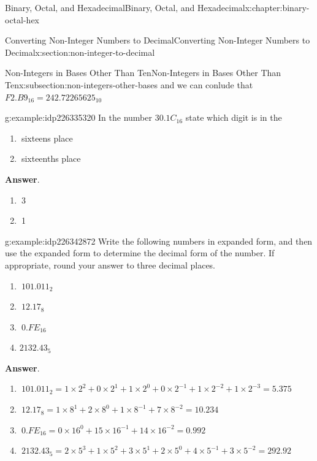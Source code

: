\documentclass[twoside,10pt,]{book}
\newcommand{\blocktitlefont}{\relax}
\numberwithin{equation}{section}
\begin{document}
\begin{chapterptx}{Binary, Octal, and Hexadecimal}{}{Binary, Octal, and Hexadecimal}{}{}{x:chapter:binary-octal-hex}
\begin{sectionptx}{Converting Non-Integer Numbers to Decimal}{}{Converting Non-Integer Numbers to Decimal}{}{}{x:section:non-integer-to-decimal}
\begin{subsectionptx}{Non-Integers in Bases Other Than Ten}{}{Non-Integers in Bases Other Than Ten}{}{}{x:subsection:non-integers-other-bases}
and we can conlude that \(F2.B9_{16}=242.72265625_{10}\)%
\begin{example}{}{g:example:idp226335320}%
In the number \(30.1C_{16}\) state which digit is in the %
\begin{enumerate}
\item{}\(\ \)sixteens place%
\item{}\(\ \)sixteenths place%
\end{enumerate}
\par\smallskip%
\noindent\textbf{\blocktitlefont Answer}.\label{g:answer:idp226335064}{}\hypertarget{g:answer:idp226335064}{}\quad{}%
\begin{enumerate}
\item{}\(\ \)3%
\item{}\(\ \)1%
\end{enumerate}
\end{example}
\begin{example}{}{g:example:idp226342872}%
Write the following numbers in expanded form, and then use the expanded form to determine the decimal form of the number.  If appropriate, round your answer to three decimal places. %
\begin{enumerate}
\item{}\(\displaystyle \ 101.011_2\)%
\item{}\(\displaystyle \ 12.17_8\)%
\item{}\(\displaystyle \ 0.FE_{16}\)%
\item{}\(\displaystyle 2132.43_5\)%
\end{enumerate}
\par\smallskip%
\noindent\textbf{\blocktitlefont Answer}.\label{g:answer:idp226343128}{}\hypertarget{g:answer:idp226343128}{}\quad{}%
\begin{enumerate}
\item{}\(\displaystyle \ 101.011_2=1\times2^2+0\times2^1+1\times2^0+0\times2^{-1}+1\times2^{-2}+1\times2^{-3}=5.375\)%
\item{}\(\displaystyle \ 12.17_8=1\times8^1+2\times8^0+1\times8^{-1}+7\times8^{-2}=10.234\)%
\item{}\(\displaystyle \ 0.FE_{16}=0\times16^0+15\times16^{-1}+14\times16^{-2}=0.992\)%
\item{}\(\displaystyle \ 2132.43_5=2\times5^3+1\times5^2+3\times5^1+2\times5^0+4\times5^{-1}+3\times5^{-2}=292.92\)%
\end{enumerate}
\end{example}
\end{subsectionptx}
%
%
\typeout{************************************************}

\end{sectionptx}
\end{chapterptx}
\end{document}
